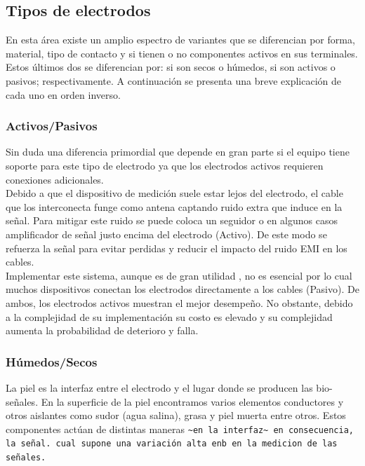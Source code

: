 \subsection{Tipos de electrodos}
\label{sec:orgc606020}
En esta área existe un amplio espectro de variantes que se diferencian por forma, material, tipo de contacto y si tienen o no componentes activos en sus terminales. Estos últimos dos se diferencian por:  si son secos o húmedos, si son activos o pasivos; respectivamente. A continuación se presenta una breve explicación de cada uno en orden inverso.\\

\subsubsection{Activos/Pasivos}
\label{sec:org89c39b7}
Sin duda una diferencia primordial que depende en gran parte si el equipo tiene soporte para este tipo de electrodo ya que los electrodos activos requieren conexiones adicionales.\\

Debido a que el dispositivo de medición suele estar lejos del electrodo, el cable que los interconecta funge como antena captando ruido extra que induce en la señal. Para mitigar este ruido se puede coloca un seguidor o en algunos casos amplificador de señal justo encima del electrodo (Activo). De este modo se refuerza la señal para evitar perdidas y reducir el impacto del ruido EMI en los cables.\\

Implementar este sistema, aunque es de gran utilidad \cite{Mathewson2017,Lopez-Gordo2014}, no es esencial por lo cual muchos dispositivos conectan los electrodos directamente a los cables (Pasivo). De ambos, los electrodos activos muestran el mejor desempeño. No obstante, debido a la complejidad de su implementación su costo es elevado y su complejidad aumenta la probabilidad de deterioro y falla.\\

\subsubsection{Húmedos/Secos}
\label{sec:orgab4a085}
La piel es la interfaz entre el electrodo y el lugar donde se producen las bio-señales. En la superficie de la piel encontramos varios elementos conductores y otros aislantes como sudor (agua salina), grasa y piel muerta entre otros. Estos componentes actúan de distintas maneras \texttt{\textasciitilde{}en la interfaz\textasciitilde{} en consecuencia, la señal. cual supone una variación alta enb en la medicion de las señales.}\\


